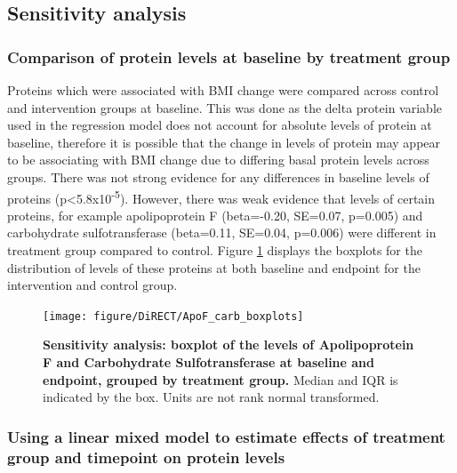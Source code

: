 \documentclass[11pt,twoside]{bristolthesis}
\begin{document}
\hypertarget{sensitivity-analysis}{%
\subsection{Sensitivity analysis}\label{sensitivity-analysis}}

\hypertarget{comparison-of-protein-levels-at-baseline-by-treatment-group}{%
\subsubsection{Comparison of protein levels at baseline by treatment group}\label{comparison-of-protein-levels-at-baseline-by-treatment-group}}

Proteins which were associated with BMI change were compared across control and intervention groups at baseline. This was done as the delta protein variable used in the regression model does not account for absolute levels of protein at baseline, therefore it is possible that the change in levels of protein may appear to be associating with BMI change due to differing basal protein levels across groups. There was not strong evidence for any differences in baseline levels of proteins (p\textless5.8x10\textsuperscript{-5}). However, there was weak evidence that levels of certain proteins, for example apolipoprotein F (beta=-0.20, SE=0.07, p=0.005) and carbohydrate sulfotransferase (beta=0.11, SE=0.04, p=0.006) were different in treatment group compared to control. Figure \ref{fig:ApoF-carb-boxplot} displays the boxplots for the distribution of levels of these proteins at both baseline and endpoint for the intervention and control group.



\begin{figure}

{\centering \texttt{[image: figure/DiRECT/ApoF\_carb\_boxplots]} 

}

\caption[Sensitivity analysis: boxplot of the levels of Apolipoprotein F and Carbohydrate Sulfotransferase at baseline and endpoint, grouped by treatment group.]{\textbf{Sensitivity analysis: boxplot of the levels of Apolipoprotein F and Carbohydrate Sulfotransferase at baseline and endpoint, grouped by treatment group.} Median and IQR is indicated by the box. Units are not rank normal transformed.}\label{fig:ApoF-carb-boxplot}
\end{figure}
\hypertarget{using-a-linear-mixed-model-to-estimate-effects-of-treatment-group-and-timepoint-on-protein-levels}{%
\subsubsection{Using a linear mixed model to estimate effects of treatment group and timepoint on protein levels}\label{using-a-linear-mixed-model-to-estimate-effects-of-treatment-group-and-timepoint-on-protein-levels}}
\end{document}
